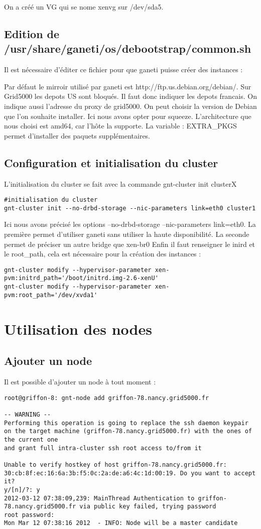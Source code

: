 On a créé un VG qui se nome xenvg sur /dev/sda5.

\subsection{Edition de /usr/share/ganeti/os/debootstrap/common.sh}

Il est nécessaire d'éditer ce fichier pour que ganeti puisse créer des instances :

Par défaut le mirroir utilisé par ganeti est http://ftp.us.debian.org/debian/. Sur Grid5000 les depots US sont bloqués. Il faut donc indiquer les depots francais. On indique aussi l'adresse du  proxy de grid5000. On peut choisir la version de Debian que l'on souhaite installer. Ici nous avons opter pour squeeze. L'architecture que nous choisi est amd64, car l'hôte la supporte. La variable : EXTRA_PKGS permet d'installer des paquets supplémentaires.

\subsection{Configuration et initialisation du cluster}
L'initialisation du cluster se fait avec la commande gnt-cluster init clusterX
\begin{lstlisting}
#initialisation du cluster
gnt-cluster init --no-drbd-storage --nic-parameters link=eth0 cluster1
\end{lstlisting}
Ici nous avons précisé les options --no-drbd-storage --nic-parameters link=eth0.
La première permet d'utiliser ganeti sans utiliser la haute disponibilité.
La seconde permet de préciser un autre bridge que xen-br0
Enfin il faut renseigner le inird et le root\_path, cela est nécessaire pour la création des instances :
\begin{lstlisting}
gnt-cluster modify --hypervisor-parameter xen-pvm:initrd_path='/boot/initrd.img-2.6-xenU'
gnt-cluster modify --hypervisor-parameter xen-pvm:root_path='/dev/xvda1'
\end{lstlisting}
\section{Utilisation des nodes}
\subsection{Ajouter un node}
Il est possible d'ajouter un node à tout moment :
\begin{lstlisting}
root@griffon-8: gnt-node add griffon-78.nancy.grid5000.fr

-- WARNING -- 
Performing this operation is going to replace the ssh daemon keypair
on the target machine (griffon-78.nancy.grid5000.fr) with the ones of the current one
and grant full intra-cluster ssh root access to/from it

Unable to verify hostkey of host griffon-78.nancy.grid5000.fr:
30:cb:8f:ec:16:6a:3b:f5:0c:2a:de:a6:4c:1d:00:19. Do you want to accept
it?
y/[n]/?: y
2012-03-12 07:38:09,239: MainThread Authentication to griffon-78.nancy.grid5000.fr via public key failed, trying password
root password:
Mon Mar 12 07:38:16 2012  - INFO: Node will be a master candidate
\end{lstlisting}
